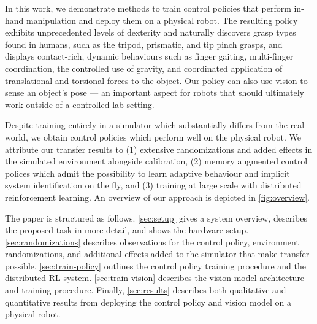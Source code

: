 In this work, we demonstrate methods to train control policies that perform in-hand manipulation %
and deploy them on a physical robot.
The resulting policy exhibits unprecedented levels of dexterity and naturally discovers grasp types found in humans, such as the tripod, prismatic, and tip pinch grasps, 
and displays contact-rich, dynamic behaviours such as finger gaiting, multi-finger coordination, the controlled use of gravity, and coordinated application of translational and torsional forces to the object.
Our policy can also use vision to sense an object's pose --- an important aspect for robots that should ultimately work outside of a controlled lab setting.

Despite training entirely in a simulator which substantially differs from the real world,
we obtain control policies which perform well on the physical robot.
We attribute our transfer results to (1) extensive randomizations and added effects in the simulated environment alongside calibration, (2) memory augmented control polices which admit the possibility to learn adaptive behaviour and implicit system identification on the fly, and (3) training at large scale with distributed reinforcement learning.
An overview of our approach is depicted in \autoref{fig:overview}.


The paper is structured as follows.
\autoref{sec:setup} gives a system overview, describes the proposed task in more detail, and shows the hardware setup. \autoref{sec:randomizations} describes observations for the control policy, environment randomizations, and additional effects added to the simulator that make transfer possible.
\autoref{sec:train-policy} outlines the control policy training procedure and the distributed RL system.
\autoref{sec:train-vision} describes the vision model architecture and training procedure.
Finally, \autoref{sec:results} describes both qualitative and quantitative results from deploying the control policy and vision model on a physical robot. %

